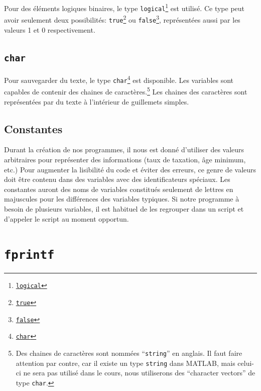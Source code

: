 \documentclass[]{tufte-handout}
\newcommand{\passthrough}[1]{#1}
\begin{document}
Pour des éléments logiques binaires, le type
\passthrough{\lstinline!logical!}\footnote{\href{https://www.mathworks.com/help/matlab/ref/logical.html}{\passthrough{\lstinline!logical!}}}
est utilisé. Ce type peut avoir seulement deux possibilités:
\passthrough{\lstinline!true!}\footnote{\href{https://www.mathworks.com/help/matlab/ref/true.html}{\passthrough{\lstinline!true!}}}
ou \passthrough{\lstinline!false!}\footnote{\href{https://www.mathworks.com/help/matlab/ref/false.html}{\passthrough{\lstinline!false!}}},
représentées aussi par les valeurs 1 et 0 respectivement.

\hypertarget{char}{%
\subsection{\texorpdfstring{\texttt{char}}{char}}\label{char}}

Pour sauvegarder du texte, le type
\passthrough{\lstinline!char!}\footnote{\href{https://www.mathworks.com/help/matlab/ref/char.html}{\passthrough{\lstinline!char!}}}
est disponible. Les variables sont capables de contenir des chaines de
caractères.\footnote{Des chaines de caractères sont nommées
  ``\passthrough{\lstinline!string!}'' en anglais. Il faut faire
  attention par contre, car il existe un type
  \passthrough{\lstinline!string!} dans MATLAB, mais celui-ci ne sera
  pas utilisé dans le cours, nous utiliserons des ``character vectors''
  de type \passthrough{\lstinline!char!}.} Les chaines des caractères
sont représentées par du texte à l'intérieur de guillemets simples.

\hypertarget{constantes}{%
\subsection{Constantes}\label{constantes}}

Durant la création de nos programmes, il nous est donné d'utiliser des
valeurs arbitraires pour représenter des informations (taux de taxation,
âge minimum, etc.) Pour augmenter la lisibilité du code et éviter des
erreurs, ce genre de valeurs doit être contenu dans des variables avec
des identificateurs spéciaux. Les constantes auront des noms de
variables constitués seulement de lettres en majuscules pour les
différences des variables typiques. Si notre programme à besoin de
plusieurs variables, il est habituel de les regrouper dans un script et
d'appeler le script au moment opportun.

\hypertarget{fprintf}{%
\section{\texorpdfstring{\texttt{fprintf}}{fprintf}}\label{fprintf}}
\end{document}
